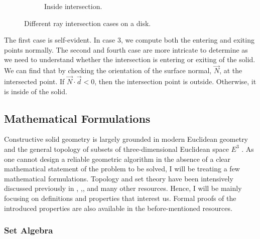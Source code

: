 \documentclass[a4paper,11pt,oneside]{article}
\begin{document}
\begin{figure}[ht]
\begin{subfigure}[b]{0.4\textwidth}
		\caption{Inside intersection.}
		\label{sec3.1:inside-intersection}
	\end{subfigure}
	\caption{Different ray intersection cases on a disk.}
	\label{sec3.1:intersection-cases}
\end{figure}


The first case is self-evident. In case 3, we compute both the entering and exiting points normally. The second and fourth case are more intricate to determine as we need to understand whether the intersection is entering or exiting of the solid. We can find that by checking the orientation of the surface normal, $\vec{N}$, at the intersected point. If $\vec{N}\cdot\vec{d} < 0$, then the intersection point is outside. Otherwise, it is inside of the solid.

\subsection{Mathematical Formulations}
  
Constructive solid geometry is largely grounded in modern Euclidean geometry and the general topology of subsets of three-dimensional Euclidean space $E^3$ \cite{Requicha1978MathematicalFO}. As one cannot design a reliable geometric algorithm in the absence of a clear mathematical statement of the problem to be solved, I will be treating a few mathematical formulations. Topology and set theory have been intensively discussed previously in \cite{Requicha1978MathematicalFO}, \cite{tilove1977a},\cite{lachlan_srebrny_zarach_1977}, and many other resources. Hence, I will be mainly focusing on definitions and properties that interest us. Formal proofs of the introduced properties are also available in the before-mentioned resources.
  
\subsubsection{Set Algebra}
  
\theoremstyle{definition}
\newtheorem{definition}{Definition}[section]
  
\theoremstyle{property}
\newtheorem{property}{Property}[section]
    
\theoremstyle{remark}
\newtheorem*{remark}{Remark}
      
\end{document}
